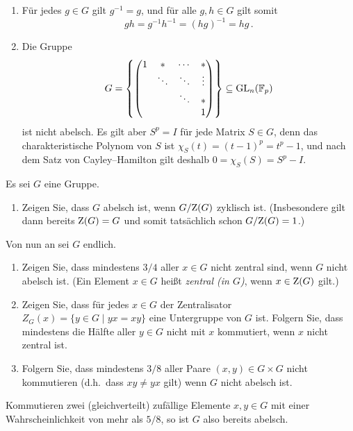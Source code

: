 \begin{solution}
  \begin{enumerate}
    \item
      Für jedes $g \in G$ gilt $g^{-1} = g$, und für alle $g, h \in G$ gilt somit
      \[
          g h
        = g^{-1} h^{-1}
        = (h g)^{-1}
        = h g \,.
      \]
    \item
      Die Gruppe
      \[
                  G
        =         \left\{
                    \begin{pmatrix}
                      1 & *       & \cdots  & *       \\
                        & \ddots  & \ddots  & \vdots  \\
                        &         & \ddots  & *       \\
                        &         &         & 1
                    \end{pmatrix}
                  \right\}
        \subseteq \operatorname{GL}_n(\mathbb{F}_p)
      \]
      ist nicht abelsch.
      Es gilt aber $S^p = I$ für jede Matrix $S \in G$, denn das charakteristische Polynom von $S$ ist $\chi_S(t) = (t-1)^p = t^p - 1$, und nach dem Satz von Cayley--Hamilton gilt deshalb $0 = \chi_S(S) = S^p - I$.
  \end{enumerate}
\end{solution}


\begin{question}[subtitle = {$5/8$ an Kommutativität}]
  Es sei $G$ eine Gruppe.
  \begin{enumerate}
    \item
      Zeigen Sie, dass $G$ abelsch ist, wenn $G/{\operatorname{Z}(G)}$ zyklisch ist.
      (Insbesondere gilt dann bereits $\operatorname{Z}(G) = G$ und somit tatsächlich schon $G/{\operatorname{Z}(G)} = 1$.)
  \end{enumerate}
  Von nun an sei $G$ endlich.
  \begin{enumerate}[resume]
    \item
      Zeigen Sie, dass mindestens $3/4$ aller $x \in G$ nicht zentral sind, wenn $G$ nicht abelsch ist.
      (Ein Element $x \in G$ heißt \emph{zentral \textup(in $G$\textup)}, wenn $x \in \operatorname{Z}(G)$ gilt.)
    \item
      Zeigen Sie, dass für jedes $x \in G$ der Zentralisator $Z_G(x) = \{y \in G \mid yx = xy\}$ eine Untergruppe von $G$ ist.
      Folgern Sie, dass mindestens die Hälfte aller $y \in G$ nicht mit $x$ kommutiert, wenn $x$ nicht zentral ist.
    \item
      Folgern Sie, dass mindestens $3/8$ aller Paare $(x,y) \in G \times G$ nicht kommutieren (d.h.\ dass $xy \neq yx$ gilt) wenn $G$ nicht abelsch ist.
  \end{enumerate}
  Kommutieren zwei (gleichverteilt) zufällige Elemente $x, y \in G$ mit einer Wahrscheinlichkeit von mehr als $5/8$, so ist $G$ also bereits abelsch.
\end{question}


